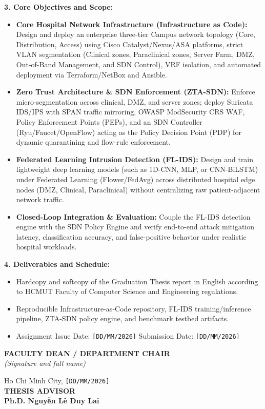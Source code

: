 \vspace{0.3cm}
\noindent\textbf{3. Core Objectives and Scope:}
\begin{itemize}[leftmargin=1.8em, itemsep=4pt]
  \item \textbf{Core Hospital Network Infrastructure (Infrastructure as Code):} Design and deploy an enterprise three-tier Campus network topology (Core, Distribution, Access) using Cisco Catalyst/Nexus/ASA platforms, strict VLAN segmentation (Clinical zones, Paraclinical zones, Server Farm, DMZ, Out-of-Band Management, and SDN Control), VRF isolation, and automated deployment via Terraform/NetBox and Ansible.
  \item \textbf{Zero Trust Architecture \& SDN Enforcement (ZTA-SDN):} Enforce micro-segmentation across clinical, DMZ, and server zones; deploy Suricata IDS/IPS with SPAN traffic mirroring, OWASP ModSecurity CRS WAF, Policy Enforcement Points (PEPs), and an SDN Controller (Ryu/Faucet/OpenFlow) acting as the Policy Decision Point (PDP) for dynamic quarantining and flow-rule enforcement.
  \item \textbf{Federated Learning Intrusion Detection (FL-IDS):} Design and train lightweight deep learning models (such as 1D-CNN, MLP, or CNN-BiLSTM) under Federated Learning (Flower/FedAvg) across distributed hospital edge nodes (DMZ, Clinical, Paraclinical) without centralizing raw patient-adjacent network traffic.
  \item \textbf{Closed-Loop Integration \& Evaluation:} Couple the FL-IDS detection engine with the SDN Policy Engine and verify end-to-end attack mitigation latency, classification accuracy, and false-positive behavior under realistic hospital workloads.
\end{itemize}

\vspace{0.3cm}
\noindent\textbf{4. Deliverables and Schedule:}
\begin{itemize}[leftmargin=1.8em, nosep]
  \item Hardcopy and softcopy of the Graduation Thesis report in English according to HCMUT Faculty of Computer Science and Engineering regulations.
  \item Reproducible Infrastructure-as-Code repository, FL-IDS training/inference pipeline, ZTA-SDN policy engine, and benchmark testbed artifacts.
  \item Assignment Issue Date: \texttt{[DD/MM/2026]} \hfill Submission Date: \texttt{[DD/MM/2026]}
\end{itemize}

\vspace{1.2cm}
\noindent
\begin{minipage}[t]{0.48\textwidth}
  \centering
  \textbf{FACULTY DEAN / DEPARTMENT CHAIR}\\[2.2cm]
  \textit{(Signature and full name)}
\end{minipage}
\hfill
\begin{minipage}[t]{0.48\textwidth}
  \centering
  Ho Chi Minh City, \texttt{[DD/MM/2026]}\\
  \textbf{THESIS ADVISOR}\\[2.2cm]
  \textbf{Ph.D. Nguyễn Lê Duy Lai}
\end{minipage}
